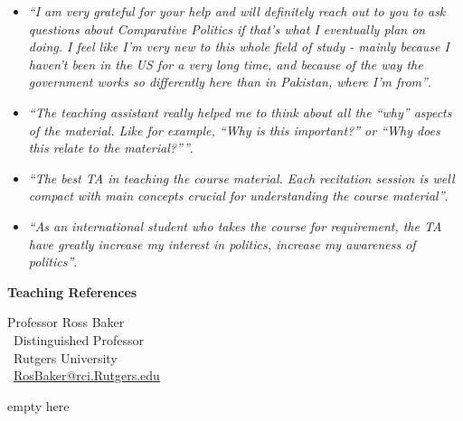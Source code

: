 \documentclass[11pt]{letter} %
\begin{document}
\begin{letter}{}
{\begin{itemize}
\item \emph{``I am very grateful for your help and will definitely reach out to you to ask questions about Comparative Politics if that's what I eventually plan on doing. I feel like I'm very new to this whole field of study - mainly because I haven't been in the US for a very long time, and because of the way the government works so differently here than in Pakistan, where I'm from''}.

\item \emph{``The teaching assistant really helped me to think about all the ``why'' aspects of the material. Like for example, ``Why is this important?'' or ``Why does this relate to the material?''''}.

\item \emph{``The best TA in teaching the course material. Each recitation session is well compact with main concepts crucial for understanding the course material''}.

\item \emph{``As an international student who takes the course for requirement, the TA have greatly increase my interest in politics, increase my awareness of politics''}.

\end{itemize}


}{\bf Teaching References}

Professor Ross Baker\\\
Distinguished Professor\\\
Rutgers University\\\
\href{mailto:rosbaker@rci.rutgers.edu}{RosBaker@rci.Rutgers.edu} 



\closing{{\color{white}empty here}}




\end{letter}
\end{document}
